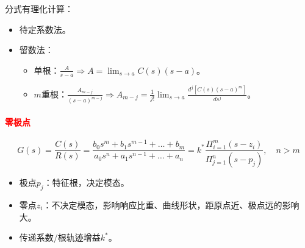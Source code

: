 \documentclass[
12pt, %
a4paper, 
oneside, %
]{scrartcl}
\begin{document}
分式有理化计算：
\begin{itemize}
\item 待定系数法。
\item 留数法：
\begin{itemize}
\item 单根：$ \frac{A}{s - a} \Rightarrow A = \lim_{s \to a} C(s) (s - a) $。
\item $ m $重根：$ \frac{A_{m - j}}{(s - a)^{m - j}} \Rightarrow A_{m - j} = \frac{1}{j!} \lim_{s \to a} \frac{d^j[C(s) (s - a)^m]}{d s^j} $。
\end{itemize}
\end{itemize}
\paragraph{\textcolor{red}{零极点}}
$$ G(s) = \frac{C(s)}{R(s)} = \frac{b_0 s^m + b_1 s^{m - 1} + \dots + b_m}{a_0 s^n + a_1 s^{n - 1} + \dots + a_n} = k^* \frac{\Pi_{i = 1}^m (s - z_i)}{\Pi_{j = 1}^n (s - p_j)}, \quad n > m $$

\begin{itemize}
\item 极点$ p_j $：特征根，决定模态。
\item 零点$ z_i $：不决定模态，影响响应比重、曲线形状，距原点近、极点远的影响大。
\item 传递系数/根轨迹增益$ k^* $。
\end{itemize}
\end{document}
